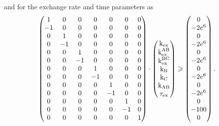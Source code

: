 and for the exchange rate and time parameters as
\begin{equation}
    \begin{pmatrix}
         1 & 0 & 0 & 0 & 0 & 0 & 0 \\
        -1 & 0 & 0 & 0 & 0 & 0 & 0 \\
         0 & 1 & 0 & 0 & 0 & 0 & 0 \\
         0 &-1 & 0 & 0 & 0 & 0 & 0 \\
         0 & 0 & 1 & 0 & 0 & 0 & 0 \\
         0 & 0 &-1 & 0 & 0 & 0 & 0 \\
         0 & 0 & 0 & 1 & 0 & 0 & 0 \\
         0 & 0 & 0 &-1 & 0 & 0 & 0 \\
         0 & 0 & 0 & 0 & 1 & 0 & 0 \\
         0 & 0 & 0 & 0 &-1 & 0 & 0 \\
         0 & 0 & 0 & 0 & 0 & 1 & 0 \\
         0 & 0 & 0 & 0 & 0 &-1 & 0 \\
         0 & 0 & 0 & 0 & 0 & 0 & 1 \\
    \end{pmatrix}
    \cdot
    \begin{pmatrix}
        \textrm{k}_{\textrm{ex}} \\
        \textrm{k}_{\textrm{ex}}^{\textrm{AB}} \\
        \textrm{k}_{\textrm{ex}}^{\textrm{BC}} \\
        \textrm{k}_{\textrm{B}} \\
        \textrm{k}_{\textrm{C}} \\
        \textrm{k}_{\textrm{AB}} \\
        \tau_{\textrm{ex}} \\
    \end{pmatrix}
    \geqslant
    \begin{pmatrix}
        0 \\
        -2e^6 \\
        0 \\
        -2e^6 \\
        0 \\
        -2e^6 \\
        0 \\
        -2e^6 \\
        0 \\
        -2e^6 \\
        0 \\
        -100 \\
        0 \\
    \end{pmatrix}.
\end{equation}

